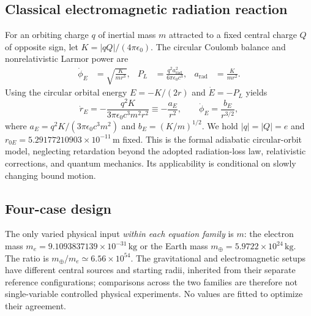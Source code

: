 \documentclass[aps,prd,reprint,onecolumn,superscriptaddress,nofootinbib]{revtex4-2}
\begin{document}
\subsection{Classical electromagnetic radiation reaction}
For an orbiting charge $q$ of inertial mass $m$ attracted to a fixed central charge $Q$ of opposite sign, let $K=|qQ|/(4\pi\epsilon_0)$. The circular Coulomb balance and nonrelativistic Larmor power are \cite{jackson1999}
\begin{align}
 \dot\phi_E&=\sqrt{\frac{K}{mr^3}}, &
 P_L&=\frac{q^2 a_{\mathrm{rad}}^2}{6\pi\epsilon_0c^3}, &
 a_{\mathrm{rad}}&=\frac{K}{mr^2}.
\end{align}
Using the circular orbital energy $E=-K/(2r)$ and $\dot E=-P_L$ yields
\begin{equation}
 \dot r_E=-\frac{q^2K}{3\pi\epsilon_0 c^3m^2r^2}\equiv-\frac{a_E}{r^2},\qquad
 \dot\phi_E=\frac{b_E}{r^{3/2}},\label{eq:E}
\end{equation}
where $a_E=q^2K/(3\pi\epsilon_0 c^3m^2)$ and $b_E=(K/m)^{1/2}$. We hold $|q|=|Q|=e$ and $r_{0E}=5.29177210903\times10^{-11}\,\mathrm m$ fixed. This is the formal adiabatic circular-orbit model, neglecting retardation beyond the adopted radiation-loss law, relativistic corrections, and quantum mechanics. Its applicability is conditional on slowly changing bound motion.

\subsection{Four-case design}
The only varied physical input \emph{within each equation family} is $m$: the electron mass $m_e=9.1093837139\times10^{-31}\,\mathrm{kg}$ or the Earth mass $m_\oplus=5.9722\times10^{24}\,\mathrm{kg}$. The ratio is $m_\oplus/m_e\simeq6.56\times10^{54}$. The gravitational and electromagnetic setups have different central sources and starting radii, inherited from their separate reference configurations; comparisons across the two families are therefore not single-variable controlled physical experiments. No values are fitted to optimize their agreement.
\end{document}
